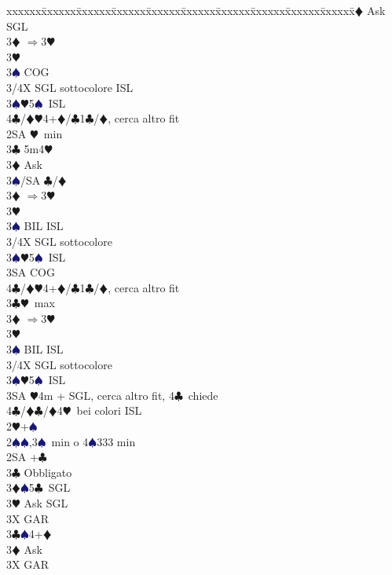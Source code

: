 \documentclass[a4paper,italian]{article}
\newcommand{\BC}{\textcolor{OliveGreen}{$\clubsuit$}}
\newcommand{\BD}{\textcolor{RedOrange}{$\vardiamondsuit$}}
\newcommand{\BH}{\textcolor{Red2}{$\varheartsuit${}}}
\newcommand{\BS}{\textcolor{MidnightBlue}{$\spadesuit${}}}
\newenvironment{bidtable}
{\begin{tabbing}

    xxxxxx\=xxxxxx\=xxxxxx\=xxxxxx\=xxxxxx\=xxxxxx\=xxxxxx\=xxxxxx\=xxxxxx\=xxxxxx\=\kill}
{\end{tabbing} }%
\begin{document}
\begin{multicols}{2}
\begin{bidtable}
        3\BD \> Ask SGL\-\\
        3\BD \> $\Rightarrow$3\BH\+\\
        3\BH\+\\
        3\BS \> COG\\
        3/4X\> SGL sottocolore ISL\-\-\\
        3\BS {}\BH 5\BS\ ISL\\
        4\BC/\BD {}\BH4+\BD/\BC1\BC/\BD, cerca altro fit \-\\
        2SA \BH\ min\+\\
        3\BC \> 5m4\BH \+\\
        3\BD \> Ask\+\\
        3\BS/SA \> \BC /\BD \-\-\\
        3\BD \> $\Rightarrow$3\BH\+\\
        3\BH\+\\
        3\BS \> BIL ISL\\
        3/4X \> SGL sottocolore \-\-\\
        3\BS {}\BH 5\BS\ ISL\\
        3SA\> COG \\
        4\BC/\BD{}\BH4+\BD/\BC1\BC/\BD, cerca altro fit\-\\
        3\BC {}\BH\ max\+\\
        3\BD \> $\Rightarrow$3\BH\+\\
        3\BH\+\\
        3\BS \> BIL ISL\\
        3/4X \> SGL sottocolore \-\-\\
        3\BS {}\BH 5\BS\ ISL\\
        3SA \BH4m + SGL, cerca altro fit, 4\BC\ chiede\\
        4\BC/\BD {}\BC /\BD4\BH\ bei colori ISL\-\-\\
        2\BH {}+\BS \+\\
        2\BS {}\BS ,3\BS\ min o 4\BS 333 min\+\\
        2SA +\BC \+\\
        3\BC \> Obbligato\+\\
        3\BD {}\BS 5\BC\ SGL\+\\
        3\BH \> Ask SGL\-\\
        3X \> GAR\-\-\\
        3\BC {}\BS 4+\BD \+\\
        3\BD \> Ask\+\\
        3X \> GAR\-\-\\

\end{bidtable}
\end{multicols}
\end{document}
